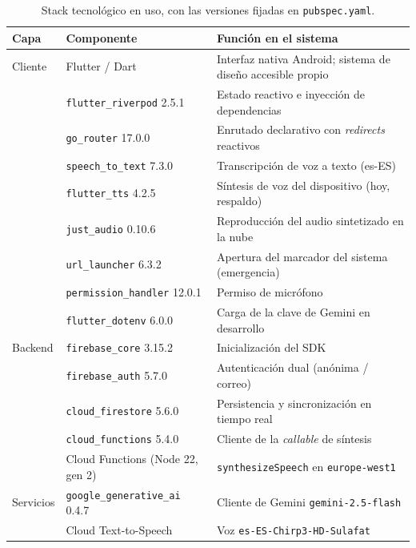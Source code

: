 \begin{table}[htbp]
    \centering
    \begin{tabularx}{\textwidth}{@{}l l >{\RaggedRight\arraybackslash}X@{}}
        \toprule
        \textbf{Capa} & \textbf{Componente} & \textbf{Función en el sistema} \\
        \midrule
        Cliente     & Flutter / Dart               & Interfaz nativa Android; sistema de diseño accesible propio \\
                    & \texttt{flutter\_riverpod} 2.5.1 & Estado reactivo e inyección de dependencias \\
                    & \texttt{go\_router} 17.0.0   & Enrutado declarativo con \emph{redirects} reactivos \\
                    & \texttt{speech\_to\_text} 7.3.0 & Transcripción de voz a texto (es-ES) \\
                    & \texttt{flutter\_tts} 4.2.5  & Síntesis de voz del dispositivo (hoy, respaldo) \\
                    & \texttt{just\_audio} 0.10.6  & Reproducción del audio sintetizado en la nube \\
                    & \texttt{url\_launcher} 6.3.2 & Apertura del marcador del sistema (emergencia) \\
                    & \texttt{permission\_handler} 12.0.1 & Permiso de micrófono \\
                    & \texttt{flutter\_dotenv} 6.0.0 & Carga de la clave de Gemini en desarrollo \\
        \midrule
        Backend     & \texttt{firebase\_core} 3.15.2 & Inicialización del SDK \\
                    & \texttt{firebase\_auth} 5.7.0  & Autenticación dual (anónima / correo) \\
                    & \texttt{cloud\_firestore} 5.6.0 & Persistencia y sincronización en tiempo real \\
                    & \texttt{cloud\_functions} 5.4.0 & Cliente de la \emph{callable} de síntesis \\
                    & Cloud Functions (Node 22, gen 2) & \texttt{synthesizeSpeech} en \texttt{europe-west1} \\
        \midrule
        Servicios   & \texttt{google\_generative\_ai} 0.4.7 & Cliente de Gemini \texttt{gemini-2.5-flash} \\
                    & Cloud Text-to-Speech           & Voz \texttt{es-ES-Chirp3-HD-Sulafat} \\
        \bottomrule
    \end{tabularx}
    \caption{Stack tecnológico en uso, con las versiones fijadas en \texttt{pubspec.yaml}.}
    \label{tab:stack}
\end{table}

